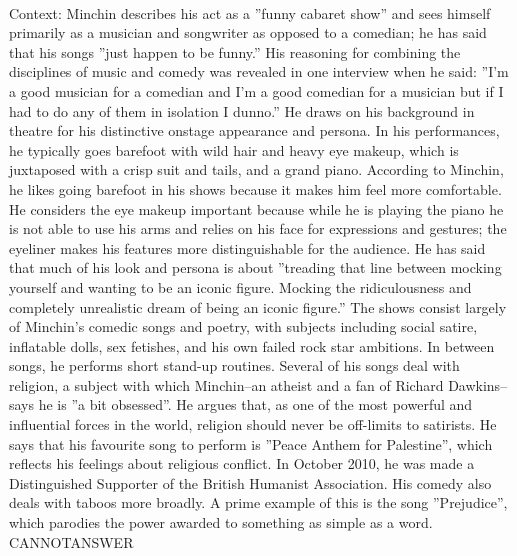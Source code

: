\documentclass[11pt,a4paper, onecolumn]{article}
\begin{document}
\\ Context: Minchin describes his act as a ''funny cabaret show'' and sees himself primarily as a musician and songwriter as opposed to a comedian; he has said that his songs ''just happen to be funny.'' His reasoning for combining the disciplines of music and comedy was revealed in one interview when he said: ''I'm a good musician for a comedian and I'm a good comedian for a musician but if I had to do any of them in isolation I dunno.'' He draws on his background in theatre for his distinctive onstage appearance and persona. In his performances, he typically goes barefoot with wild hair and heavy eye makeup, which is juxtaposed with a crisp suit and tails, and a grand piano. According to Minchin, he likes going barefoot in his shows because it makes him feel more comfortable. He considers the eye makeup important because while he is playing the piano he is not able to use his arms and relies on his face for expressions and gestures; the eyeliner makes his features more distinguishable for the audience. He has said that much of his look and persona is about ''treading that line between mocking yourself and wanting to be an iconic figure. Mocking the ridiculousness and completely unrealistic dream of being an iconic figure.'' The shows consist largely of Minchin's comedic songs and poetry, with subjects including social satire, inflatable dolls, sex fetishes, and his own failed rock star ambitions. In between songs, he performs short stand-up routines. Several of his songs deal with religion, a subject with which Minchin--an atheist and a fan of Richard Dawkins--says he is ''a bit obsessed''. He argues that, as one of the most powerful and influential forces in the world, religion should never be off-limits to satirists. He says that his favourite song to perform is ''Peace Anthem for Palestine'', which reflects his feelings about religious conflict. In October 2010, he was made a Distinguished Supporter of the British Humanist Association. His comedy also deals with taboos more broadly. A prime example of this is the song ''Prejudice'', which parodies the power awarded to something as simple as a word. CANNOTANSWER
\end{document}
